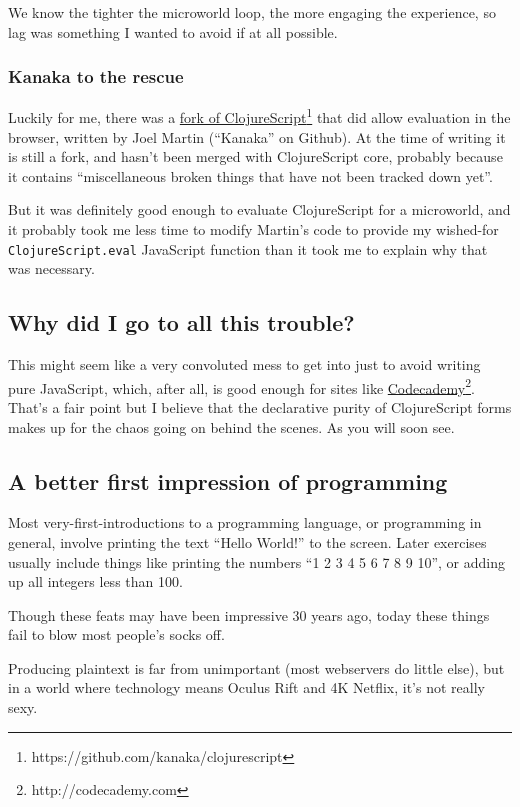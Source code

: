 We know the tighter the microworld loop, the more engaging the experience, so lag was something I wanted to avoid if at all possible.

\subsubsection{Kanaka to the rescue}

Luckily for me, there was a \href{https://github.com/kanaka/clojurescript}{fork of ClojureScript}\footnote{https://github.com/kanaka/clojurescript} that did allow evaluation in the browser, written by Joel Martin
(``Kanaka'' on Github). At the time of writing it is still a fork, and
hasn't been merged with ClojureScript core, probably because it contains
``miscellaneous broken things that have not been tracked down yet''.

But it was definitely good enough to evaluate ClojureScript for a
microworld, and it probably took me less time to modify Martin's code to
provide my wished-for \texttt{ClojureScript.eval} JavaScript function
than it took me to explain why that was necessary.

\subsection{Why did I go to all this trouble?}

This might seem like a very convoluted mess to get into just to avoid
writing pure JavaScript, which, after all, is good enough for sites like
\href{http://codecademy.com}{Codecademy}\footnote{http://codecademy.com}. That's a fair point but I believe that the declarative
purity of ClojureScript forms makes up for the chaos going on behind the
scenes. As you will soon see.

\subsection{A better first impression of programming}

Most very-first-introductions to a programming language, or programming
in general, involve printing the text ``Hello World!'' to the screen.
Later exercises usually include things like printing the numbers ``1 2 3
4 5 6 7 8 9 10'', or adding up all integers less than 100.

Though these feats may have been impressive 30 years ago, today these things fail to blow
most people's socks off.

Producing plaintext is far from unimportant (most webservers do little
else), but in a world where technology means Oculus Rift and 4K Netflix,
it's not really sexy.

